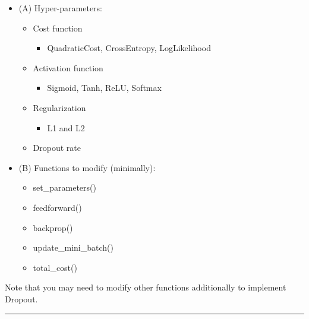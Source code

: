 \documentclass[11pt]{article}
\begin{document}
\begin{itemize}
\item (A) Hyper-parameters:

\begin{itemize}
\item Cost function
\begin{itemize}
\item QuadraticCost, CrossEntropy, LogLikelihood
\end{itemize}
\item Activation function
\begin{itemize}
\item Sigmoid, Tanh, ReLU, Softmax
\end{itemize}
\item Regularization
\begin{itemize}
\item L1 and L2
\end{itemize}
\item Dropout rate
\end{itemize}

\item (B) Functions to modify (minimally):

\begin{itemize}
\item set\_parameters()
\item feedforward()
\item backprop()
\item update\_mini\_batch()
\item total\_cost()
\end{itemize}
\end{itemize}

Note that you may need to modify other functions additionally to implement Dropout.

\noindent\rule{\textwidth}{0.5pt}
\end{document}
